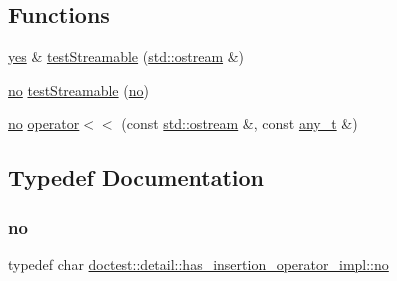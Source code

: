 \subsection*{Functions}
\begin{DoxyCompactItemize}
\item 
\hyperlink{namespacedoctest_1_1detail_1_1has__insertion__operator__impl_a0351593f27f12bf077fd702f6fc26fb5}{yes} \& \hyperlink{namespacedoctest_1_1detail_1_1has__insertion__operator__impl_a0d220c1c0845fcc4952ed6d45ac254aa}{test\+Streamable} (\hyperlink{doctest_8h_a116af65cb5e924b33ad9d9ecd7a783f3}{std\+::ostream} \&)
\item 
\hyperlink{namespacedoctest_1_1detail_1_1has__insertion__operator__impl_a2abd7cf8c326904d6f21a4ef7bddb8e1}{no} \hyperlink{namespacedoctest_1_1detail_1_1has__insertion__operator__impl_a14a51200f83133bfb49ad3cfe34505ae}{test\+Streamable} (\hyperlink{namespacedoctest_1_1detail_1_1has__insertion__operator__impl_a2abd7cf8c326904d6f21a4ef7bddb8e1}{no})
\item 
\hyperlink{namespacedoctest_1_1detail_1_1has__insertion__operator__impl_a2abd7cf8c326904d6f21a4ef7bddb8e1}{no} \hyperlink{namespacedoctest_1_1detail_1_1has__insertion__operator__impl_a367dae13457d78cc62c6be6f503125dc}{operator$<$$<$} (const \hyperlink{doctest_8h_a116af65cb5e924b33ad9d9ecd7a783f3}{std\+::ostream} \&, const \hyperlink{structdoctest_1_1detail_1_1has__insertion__operator__impl_1_1any__t}{any\+\_\+t} \&)
\end{DoxyCompactItemize}


\subsection{Typedef Documentation}
\mbox{\label{namespacedoctest_1_1detail_1_1has__insertion__operator__impl_a2abd7cf8c326904d6f21a4ef7bddb8e1}} 
\subsubsection{\texorpdfstring{no}{no}}
{\footnotesize\ttfamily typedef char \hyperlink{namespacedoctest_1_1detail_1_1has__insertion__operator__impl_a2abd7cf8c326904d6f21a4ef7bddb8e1}{doctest\+::detail\+::has\+\_\+insertion\+\_\+operator\+\_\+impl\+::no}}

